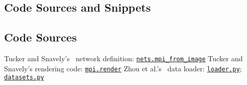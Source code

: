 \begin{appendices}
\chapter{Code Sources and Snippets}\label{app:code-sources-snippets}

\section{Code Sources}\label{sec:code-sources}

\begin{outline}
    \1 Tucker and Snavely's~\cite{single_view_mpi} network definition: \href{https://github.com/google-research/google-research/blob/ea313c6e96acce6c863de41615c6cf4079b8ca94/single_view_mpi/libs/nets.py#L146}{\texttt{nets.mpi\_from\_image}}
    \1 Tucker and Snavely's rendering code: \href{https://github.com/google-research/google-research/blob/ea313c6e96acce6c863de41615c6cf4079b8ca94/single_view_mpi/libs/mpi.py#L232}{\texttt{mpi.render}}
    \1 Zhou et al.'s~\cite{zhou2018stereo} data loader: \href{https://github.com/google/stereo-magnification/blob/f2041f80ed8c340173a6048375ba900201c1f1e7/stereomag/loader.py}{\texttt{loader.py}}; \href{https://github.com/google/stereo-magnification/blob/f2041f80ed8c340173a6048375ba900201c1f1e7/stereomag/datasets.py}{\texttt{datasets.py}}
\end{outline}

\end{appendices}